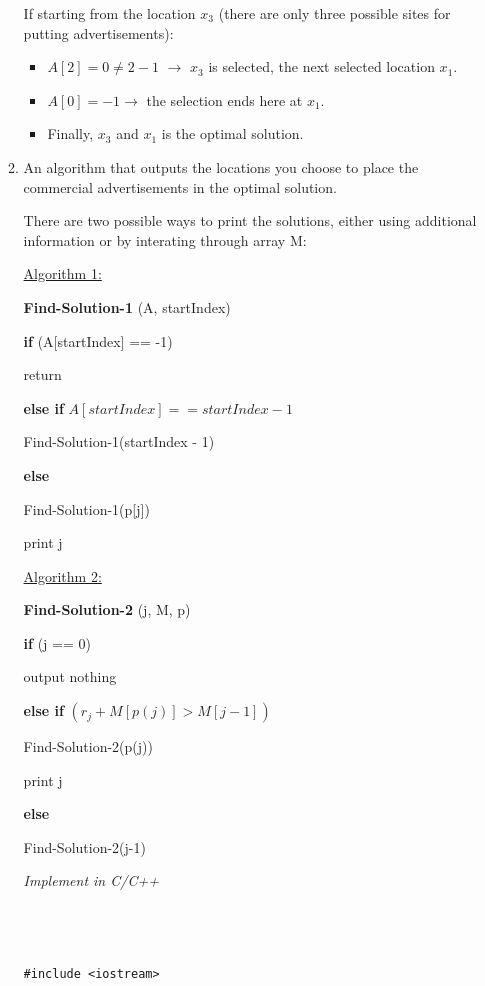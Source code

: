 \documentclass[11pts]{report}
\begin{document}
\begin{enumerate}
\begin{enumerate}
\par If starting from the location $x_3$ (there are only three possible sites for putting advertisements):

\begin{itemize}
\item $A[2] = 0 \neq 2 - 1$ $\to$ $x_3$ is selected, the next selected location $x_1$.
\item $A[0] = -1 \to$ the selection ends here at $x_1$.
\item Finally, $x_3$ and $x_1$ is the optimal solution.
\end{itemize}

\item An algorithm that outputs the locations you choose to place the commercial advertisements in the optimal solution.

There are two possible ways to print the solutions, either using additional information or by interating through array M:
\par \underline{Algorithm 1:}
\par \textbf{Find-Solution-1} (A, startIndex)
\par \textbf{if} (A[startIndex] == -1)
\par \quad return
\par \textbf{else if} $A[startIndex] == startIndex - 1$
\par \quad Find-Solution-1(startIndex - 1)
\par \textbf{else}
\par \quad Find-Solution-1(p[j])
\par \quad print j

\par \underline{Algorithm 2:}
\par \textbf{Find-Solution-2} (j, M, p)
\par \textbf{if} (j == 0)
\par \quad output nothing
\par \textbf{else if} $(r_j + M[p(j)] > M[j-1])$
\par \quad Find-Solution-2(p(j))
\par \quad print j
\par \textbf{else}
\par \quad Find-Solution-2(j-1)

\textit{Implement in C/C++}

\begin{lstlisting}



#include <iostream>


\end{lstlisting}
\end{enumerate}
\end{enumerate}
\end{document}
